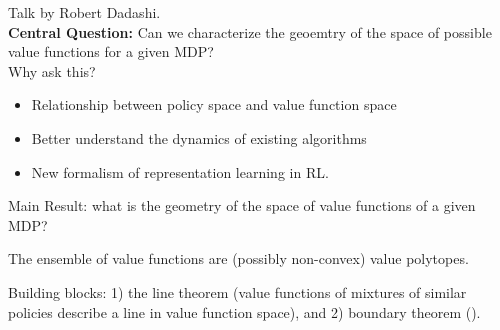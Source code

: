 Talk by Robert Dadashi. \\

{\bf Central Question:} Can we characterize the geoemtry of the space of possible value functions for a given MDP? \\

Why ask this?
\begin{itemize}
    \item Relationship between policy space and value function space
    \item Better understand the dynamics of existing algorithms
    \item New formalism of representation learning in RL.
\end{itemize}

Main Result: what is the geometry of the space of value functions of a given MDP?
\begin{theorem}
The ensemble of value functions are (possibly non-convex) value polytopes.
\end{theorem}

Building blocks: 1) the line theorem (value functions of mixtures of similar policies describe a line in value function space), and 2) boundary theorem ().\\

